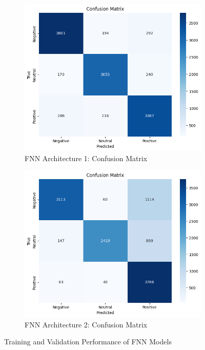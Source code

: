 \begin{figure}[h!]
\begin{subfigure}[t]{0.23\textwidth}
\centering
\includegraphics[width=\textwidth]{./images/fnn1-cm.png}
\caption{FNN Architecture 1: Confusion Matrix}
\label{fig:fnn2_accuracy}
\end{subfigure}
\hfill
\begin{subfigure}[t]{0.23\textwidth}
\centering
\includegraphics[width=\textwidth]{./images/fnn2-cm.png}
\caption{FNN Architecture 2: Confusion Matrix}
\label{fig:fnn2_loss}
\end{subfigure}
\caption{Training and Validation Performance of FNN Models}
\label{fig:fnn_performance}
\end{figure}

